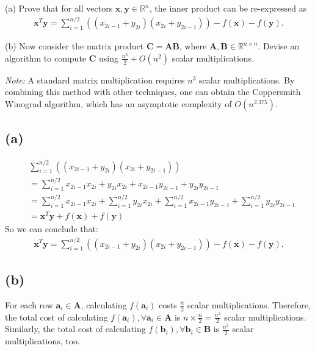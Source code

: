 \documentclass{article}
\newcommand{\R}{\mathbb{R}}
\begin{document}
\noindent 
(a) Prove that for all vectors \(\bm{x}, \bm{y} \in \R^n\), the inner product can be re-expressed as
\begin{align*}
    \bm{x}^T\bm{y} = \sum_{i = 1}^{n / 2}((x_{2i - 1} + y_{2i})(x_{2i} + y_{2i - 1})) - f(\bm{x}) - f(\bm{y}).
\end{align*}

\noindent 
(b) Now consider the matrix product \(\bm{C} = \bm{A}\bm{B}\), where \(\bm{A}, \bm{B} \in \R^{n \times n}\). Devise an algorithm to compute \(\bm{C}\) using
\(\frac{n^3}{2} + \textit{O}(n^2)\) scalar multiplications.

\noindent
\textit{Note:} A standard matrix multiplication requires \(n^3\) scalar multiplications. By combining this method with other techniques, one can obtain
the Coppersmith Winograd algorithm, which has an asymptotic complexity of \(O(n^{2.375})\).

\subsection*{(a)}
\begin{align*}
    &\sum_{i = 1}^{n / 2}((x_{2i - 1} + y_{2i})(x_{2i} + y_{2i - 1})) \\
    &=\sum_{i = 1}^{n / 2}x_{2i - 1}x_{2i} + y_{2i}x_{2i} + x_{2i - 1}y_{2i - 1} +  y_{2i}y_{2i - 1} \\
    &=\sum_{i = 1}^{n / 2}x_{2i - 1}x_{2i} + \sum_{i = 1}^{n / 2}y_{2i}x_{2i} + \sum_{i = 1}^{n / 2}x_{2i - 1}y_{2i - 1} +  \sum_{i = 1}^{n / 2}y_{2i}y_{2i - 1} \\
    &= \bm{x}^T\bm{y} + f(\bm{x}) + f(\bm{y})
\end{align*}
So we can conclude that:
\begin{align*}
    \bm{x}^T\bm{y} = \sum_{i = 1}^{n / 2}((x_{2i - 1} + y_{2i})(x_{2i} + y_{2i - 1})) - f(\bm{x}) - f(\bm{y}).
\end{align*}

\subsection*{(b)}
\noindent
For each row \(\bm{a}_i \in \bm{A}\), calculating \(f(\bm{a}_i)\) costs \(\frac{n}{2}\) scalar multiplications. Therefore, the total cost of calculating \(f(\bm{a}_i), \forall \bm{a}_i \in \bm{A}\) is \(n \times \frac{n}{2} = \frac{n^2}{2}\) scalar multiplications. Similarly, the total cost of calculating \(f(\bm{b}_i),  \forall \bm{b}_i \in \bm{B}\) is \(\frac{n^2}{2}\) scalar multiplications, too.
\end{document}
